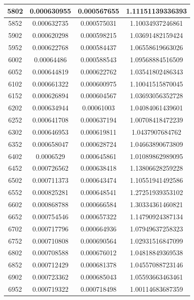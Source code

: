 \documentclass{article}
\begin{document}
\begin{longtable}{|c|c|c|c|}
		5802	&   0.000630955	  & 0.000567655	 &  1.11151139336393   \\ \hline
		5852	&   0.000632735	  & 0.000575031	 &  1.10034937246861   \\ \hline
		5902	&   0.000620298	  & 0.000598215	 &  1.03691482159424   \\ \hline
		5952	&   0.000622768	  & 0.000584437	 &  1.06558619663026   \\ \hline
		6002	&   0.00064486	  & 0.000588543	 &  1.09568884516509   \\ \hline
		6052	&   0.000644819	  & 0.000622762	 &  1.03541802486343   \\ \hline
		6102	&   0.000661322	  & 0.000600975	 &  1.10041515870045   \\ \hline
		6152	&   0.000626894	  & 0.000604567	 &  1.03693056352728   \\ \hline
		6202	&   0.000634944	  & 0.00061003	 &  1.04084061439601   \\ \hline
		6252	&   0.000641708	  & 0.000637194	 &  1.00708418472239   \\ \hline
		6302	&   0.000646953	  & 0.000619811	 &  1.0437907684762   \\ \hline
		6352	&   0.000658047	  & 0.000628724	 &  1.04663890673809   \\ \hline
		6402	&   0.0006529	  & 0.000645861	 &  1.01089862989095   \\ \hline
		6452	&   0.000726562	  & 0.000638418	 &  1.13806628259228   \\ \hline
		6502	&   0.000711373	  & 0.000643474	 &  1.10551941492586   \\ \hline
		6552	&   0.000825281	  & 0.000648541	 &  1.27251939353102   \\ \hline
		6602	&   0.000868788	  & 0.000666584	 &  1.30334361460821   \\ \hline
		6652	&   0.000754546	  & 0.000657322	 &  1.14790924387134   \\ \hline
		6702	&   0.000717796	  & 0.000664936	 &  1.07949637258323   \\ \hline
		6752	&   0.000710808	  & 0.000690564	 &  1.02931516847099   \\ \hline
		6802	&   0.000708588	  & 0.000676012	 &  1.04818849369538   \\ \hline
		6852	&   0.000712429	  & 0.000681378	 &  1.04557088723146   \\ \hline
		6902	&   0.000723362	  & 0.000685043	 &  1.05593663463461   \\ \hline
		6952	&   0.000719322	  & 0.000718498	 &  1.00114683687359   \\ \hline

\end{longtable}
\end{document}
